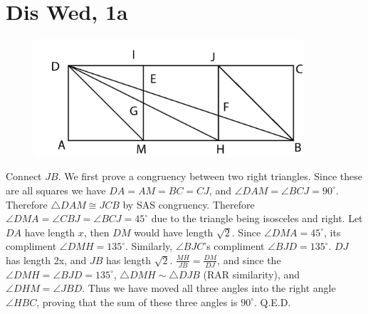 \documentclass[12pt]{article}
\newcommand{\degrees}{^{\circ}}
\begin{document}
\section{Dis Wed, 1a}
\begin{figure}[h]
    \includegraphics[width = 100mm]{GRAPH4.png}
\end{figure}
Connect $JB$.
\newline
We first prove a congruency between two right triangles. Since these are all squares we have $DA = AM = BC = CJ$, and $\angle DAM = \angle BCJ = 90 \degrees$. Therefore $\triangle DAM \cong JCB$ by SAS congruency.
\newline
Therefore $\angle DMA = \angle CBJ = \angle BCJ = 45 \degrees$ due to the triangle being isosceles and right. Let $DA$ have length $x$, then $DM$ would have length $\sqrt 2$. Since $\angle DMA = 45 \degrees$, its compliment $\angle DMH = 135 \degrees$. Similarly, $\angle BJC$'s compliment $\angle BJD = 135 \degrees$. $DJ$ has length 2x, and $JB$ has length $\sqrt 2$.
\newline
$\frac{MH}{JB} = \frac{DM}{DJ}$, and since the $\angle DMH = \angle BJD = 135 \degrees$, $\triangle DMH \sim \triangle DJB$ (RAR similarity), and $\angle DHM = \angle JBD$.
\newline
Thus we have moved all three angles into the right angle $\angle HBC$, proving that the sum of these three angles is $90 \degrees$. Q.E.D.
\newpage
\end{document}
